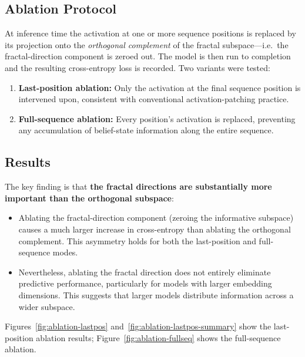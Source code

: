 \documentclass[11pt]{article}
\begin{document}
\subsection{Ablation Protocol}

At inference time the activation at one or more sequence positions is replaced by its projection onto the \emph{orthogonal complement} of the fractal subspace---i.e.\ the fractal-direction component is zeroed out.  The model is then run to completion and the resulting cross-entropy loss is recorded.  Two variants were tested:
\begin{enumerate}
  \item \textbf{Last-position ablation:} Only the activation at the final sequence position is intervened upon, consistent with conventional activation-patching practice.
  \item \textbf{Full-sequence ablation:} Every position's activation is replaced, preventing any accumulation of belief-state information along the entire sequence.
\end{enumerate}

\subsection{Results}

The key finding is that \textbf{the fractal directions are substantially more important than the orthogonal subspace}:
\begin{itemize}
  \item Ablating the fractal-direction component (zeroing the informative subspace) causes a much larger increase in cross-entropy than ablating the orthogonal complement.  This asymmetry holds for both the last-position and full-sequence modes.
  \item Nevertheless, ablating the fractal direction does not entirely eliminate predictive performance, particularly for models with larger embedding dimensions.  This suggests that larger models distribute information across a wider subspace.
\end{itemize}

Figures~\ref{fig:ablation-lastpos} and~\ref{fig:ablation-lastpos-summary} show the last-position ablation results; Figure~\ref{fig:ablation-fullseq} shows the full-sequence ablation.
\end{document}
